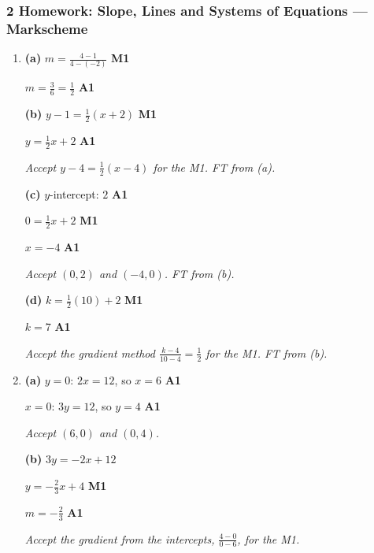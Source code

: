 \documentclass[12pt, twoside]{article}
\begin{document}
\subsubsection*{2 Homework: Slope, Lines and Systems of Equations --- Markscheme}

\begin{enumerate}[itemsep=0.3cm]

\item[1.] [Maximum mark: 9]

\textbf{(a)} $m = \frac{4 - 1}{4 - (-2)}$ \hfill \textbf{M1}

$m = \frac{3}{6} = \frac{1}{2}$ \hfill \textbf{A1}

\textbf{(b)} $y - 1 = \frac{1}{2}(x + 2)$ \hfill \textbf{M1}

$y = \frac{1}{2}x + 2$ \hfill \textbf{A1}

\emph{Accept $y - 4 = \frac{1}{2}(x - 4)$ for the M1. FT from (a).}

\textbf{(c)} $y$-intercept: $2$ \hfill \textbf{A1}

$0 = \frac{1}{2}x + 2$ \hfill \textbf{M1}

$x = -4$ \hfill \textbf{A1}

\emph{Accept $(0, 2)$ and $(-4, 0)$. FT from (b).}

\textbf{(d)} $k = \frac{1}{2}(10) + 2$ \hfill \textbf{M1}

$k = 7$ \hfill \textbf{A1}

\emph{Accept the gradient method $\frac{k - 4}{10 - 4} = \frac{1}{2}$ for the
M1. FT from (b).}

\medskip

\item[2.] [Maximum mark: 9]

\textbf{(a)} $y = 0$: $2x = 12$, so $x = 6$ \hfill \textbf{A1}

$x = 0$: $3y = 12$, so $y = 4$ \hfill \textbf{A1}

\emph{Accept $(6, 0)$ and $(0, 4)$.}

\textbf{(b)} $3y = -2x + 12$

$y = -\frac{2}{3}x + 4$ \hfill \textbf{M1}

$m = -\frac{2}{3}$ \hfill \textbf{A1}

\emph{Accept the gradient from the intercepts, $\frac{4 - 0}{0 - 6}$, for the
M1.}


\end{enumerate}
\end{document}

